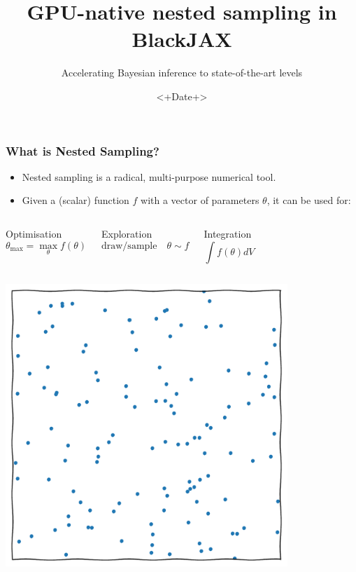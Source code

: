 \documentclass[aspectratio=169]{beamer}
\title{GPU-native nested sampling in BlackJAX}
\subtitle{Accelerating Bayesian inference to state-of-the-art levels}
\date{<+Date+>}
\begin{document}
\begin{frame}
    \titlepage
\end{frame}

\begin{frame}
    \frametitle{What is Nested Sampling?}
    \begin{itemize}
        \item Nested sampling is a radical, multi-purpose numerical tool.
        \item Given a (scalar) function $f$ with a vector of parameters $\theta$, it can be used for:
    \end{itemize}
    \vspace{-10pt}
    \begin{columns}[t]
        \begin{block}{Optimisation}
            \[\theta_\text{max} = \max_\theta{f(\theta)}\]
        \end{block}
        \begin{block}{Exploration}
            \vspace{-10pt}
            \[\text{draw/sample}\quad \theta\sim f\]
            \vspace{-15pt}
        \end{block}
        \begin{block}{Integration}
            \[\int f(\theta) dV \]
        \end{block}
    \end{columns}
    \begin{columns}[t]
        \centerline{\includegraphics[width=0.8\textwidth,page=13]{figures/himmelblau}}

\end{columns}
\end{frame}
\end{document}
